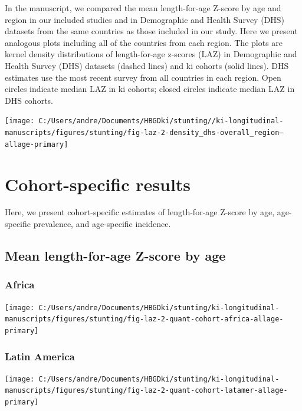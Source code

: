 \documentclass[
  9pt,
]{book}
\begin{document}
\raggedright

In the manuscript, we compared the mean length-for-age Z-score by age and region in our included studies and in Demographic and Health Survey (DHS) datasets from the same countries as those included in our study. Here we present analogous plots including all of the countries from each region. The plots are kernel density distributions of length-for-age z-scores (LAZ) in Demographic and Health Survey (DHS) datasets (dashed lines) and ki cohorts (solid lines). DHS estimates use the most recent survey from all countries in each region. Open circles indicate median LAZ in ki cohorts; closed circles indicate median LAZ in DHS cohorts.

\texttt{[image: C:/Users/andre/Documents/HBGDki/stunting//ki-longitudinal-manuscripts/figures/stunting/fig-laz-2-density\_dhs-overall\_region--allage-primary]}

\hypertarget{cohort}{%
\chapter{Cohort-specific results}\label{cohort}}

\raggedright

Here, we present cohort-specific estimates of length-for-age Z-score by age, age-specific prevalence, and age-specific incidence.

\hypertarget{mean-length-for-age-z-score-by-age}{%
\section{Mean length-for-age Z-score by age}\label{mean-length-for-age-z-score-by-age}}

\hypertarget{africa}{%
\subsection{Africa}\label{africa}}

\texttt{[image: C:/Users/andre/Documents/HBGDki/stunting/ki-longitudinal-manuscripts/figures/stunting/fig-laz-2-quant-cohort-africa-allage-primary]}

\hypertarget{latin-america}{%
\subsection{Latin America}\label{latin-america}}

\texttt{[image: C:/Users/andre/Documents/HBGDki/stunting/ki-longitudinal-manuscripts/figures/stunting/fig-laz-2-quant-cohort-latamer-allage-primary]}
\end{document}
